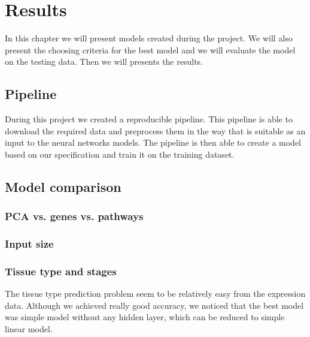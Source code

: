 \chapter{Results}
In this chapter we will present models created during the project.
We will also present the choosing criteria for the best model and we will evaluate the model on the testing data.
Then we will presents the results.

\section{Pipeline}
During this project we created a reproducible pipeline.
This pipeline is able to download the required data and preprocess them in the way that is suitable as an input to the neural networks models.
The pipeline is then able to create a model based on our specification and train it on the training dataset.

\section{Model comparison}

\subsection{PCA vs. genes vs. pathways}
\subsection{Input size}
\subsection{Tissue type and stages}
The tissue type prediction problem seem to be relatively easy from the expression data.
Although we achieved really good accuracy, we noticed that the best model was simple model without any hidden layer, which can be reduced to simple linear model.
